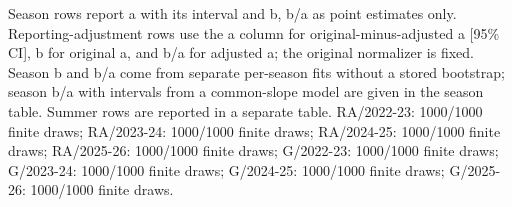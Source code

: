\noindent\begin{minipage}{\linewidth}\footnotesize\raggedright
Season rows report a with its interval and b, b/a as point estimates only. Reporting-adjustment rows use the a column for original-minus-adjusted a [95\% CI], b for original a, and b/a for adjusted a; the original normalizer is fixed. Season b and b/a come from separate per-season fits without a stored bootstrap; season b/a with intervals from a common-slope model are given in the season table. Summer rows are reported in a separate table. RA/2022-23: 1000/1000 finite draws; RA/2023-24: 1000/1000 finite draws; RA/2024-25: 1000/1000 finite draws; RA/2025-26: 1000/1000 finite draws; G/2022-23: 1000/1000 finite draws; G/2023-24: 1000/1000 finite draws; G/2024-25: 1000/1000 finite draws; G/2025-26: 1000/1000 finite draws.
\end{minipage}\par
\endgroup
